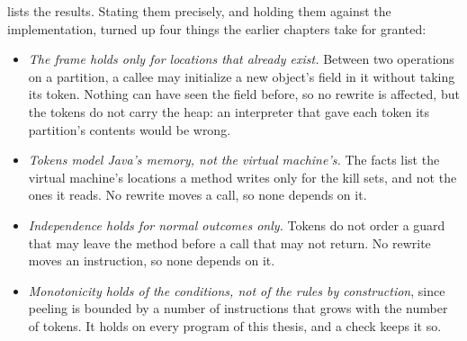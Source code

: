  lists the results. Stating them precisely, and holding
them against the implementation, turned up four things the earlier chapters
take for granted:
\begin{itemize}
\item \emph{The frame holds only for locations that already exist.} Between two
  operations on a partition, a callee may initialize a new object's field in it
  without taking its token. Nothing can have seen the field before, so no
  rewrite is affected, but the tokens do not carry the heap: an interpreter that
  gave each token its partition's contents would be wrong.
\item \emph{Tokens model Java's memory, not the virtual machine's.} The facts
  list the virtual machine's locations a method writes only for the kill sets,
  and not the ones it reads. No rewrite moves a call, so none depends on it.
\item \emph{Independence holds for normal outcomes only.} Tokens do not order a
  guard that may leave the method before a call that may not return. No rewrite
  moves an instruction, so none depends on it.
\item \emph{Monotonicity holds of the conditions, not of the rules by
  construction}, since peeling is bounded by a number of instructions that
  grows with the number of tokens. It holds on every program of this thesis,
  and a check keeps it so.
\end{itemize}
